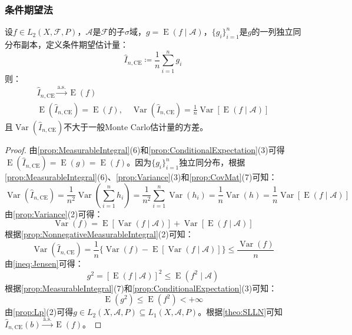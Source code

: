 \subsubsection{条件期望法}
\begin{method}
	设$f\in L_2(X,\mathscr{F},P)$，$\mathscr{A}$是$\mathscr{F}$的子$\sigma$域，$g=\operatorname{E}(f\mid\mathscr{A})$，$\{g_i\}_{i=1}^n$是$g$的一列独立同分布副本，定义条件期望估计量：
	\begin{equation*}
		\hat{I}_{n,\mathrm{CE}}\coloneq\frac{1}{n}\sum_{i=1}^{n}g_i
	\end{equation*}
	则：
	\begin{gather*}
		\hat{I}_{n,\mathrm{CE}}\overset{\text{a.s.}}{\longrightarrow}\operatorname{E}(f) \\
		\operatorname{E}(\hat{I}_{n,\mathrm{CE}})=\operatorname{E}(f),\quad\operatorname{Var}(\hat{I}_{n,\mathrm{CE}})=\frac{1}{n}\operatorname{Var}[\operatorname{E}(f\mid\mathscr{A})]
	\end{gather*}
	且$\operatorname{Var}(\hat{I}_{n,\mathrm{CE}})$不大于一般Monte Carlo估计量的方差。
\end{method}
\begin{proof}
	由\cref{prop:MeasurableIntegral}(6)和\cref{prop:ConditionalExpectation}(3)可得$\operatorname{E}(\hat{I}_{n,\mathrm{CE}})=\operatorname{E}(g)=\operatorname{E}(f)$。因为$\{g_i\}_{i=1}^n$独立同分布，根据\cref{prop:MeasurableIntegral}(6)、\cref{prop:Variance}(3)和\cref{prop:CovMat}(7)可知：
	\begin{equation*}
		\operatorname{Var}(\hat{I}_{n,\mathrm{CE}})=\frac{1}{n^2}\operatorname{Var}\left(\sum_{i=1}^{n}h_i\right)=\frac{1}{n^2}\sum_{i=1}^{n}\operatorname{Var}(h_i)=\frac{1}{n}\operatorname{Var}(h)=\frac{1}{n}\operatorname{Var}[\operatorname{E}(f\mid\mathscr{A})]
	\end{equation*}
	由\cref{prop:Variance}(2)可得：
	\begin{equation*}
		\operatorname{Var}(f)=\operatorname{E}[\operatorname{Var}(f\mid\mathscr{A})]+\operatorname{Var}[\operatorname{E}(f\mid\mathscr{A})]
	\end{equation*}
	根据\cref{prop:NonnegativeMeasurableIntegral}(2)可知：
	\begin{equation*}
		\operatorname{Var}(\hat{I}_{n,\mathrm{CE}})=\frac{1}{n}\{\operatorname{Var}(f)-\operatorname{E}[\operatorname{Var}(f\mid\mathscr{A})]\}\leqslant\frac{\operatorname{Var}(f)}{n}
	\end{equation*}
	由\cref{ineq:Jensen}可得：
	\begin{equation*}
		g^2=[\operatorname{E}(f\mid\mathscr{A})]^2\leqslant\operatorname{E}(f^2\mid\mathscr{A})
	\end{equation*}
	根据\cref{prop:MeasurableIntegral}(7)和\cref{prop:ConditionalExpectation}(3)可知：
	\begin{equation*}
		\operatorname{E}(g^2)\leqslant\operatorname{E}(f^2)<+\infty
	\end{equation*}
	由\cref{prop:Lp}(2)可得$g\in L_2(X,\mathscr{A},P)\subseteq L_1(X,\mathscr{A},P)$。根据\cref{theo:SLLN}可知$\hat{I}_{n,\mathrm{CE}}(b)\overset{\text{a.s.}}{\longrightarrow}\operatorname{E}(f)$。
\end{proof}